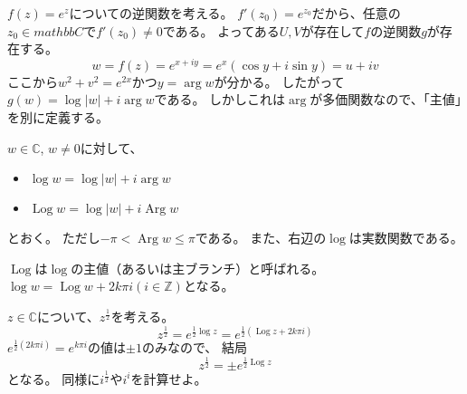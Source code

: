 \documentclass[a4paper]{jarticle}
\newcommand{\Log}{\operatorname{Log}}
\newcommand{\Arg}{\operatorname{Arg}}
\begin{document}
    $f(z)=e^{z}$についての逆関数を考える。
    $f'(z_0)=e^{z_0}$だから、任意の$z_0 \in mathbb{C}$で$f'(z_0) \neq 0$である。
    よってある$U, V$が存在して$f$の逆関数$g$が存在する。
    \[ w=f(z)=e^{x+iy}=e^x (\cos y+i\sin y)=u+iv \]
    ここから$w^2+v^2=e^{2x}$かつ$y=\arg w$が分かる。
    したがって$g(w)=\log |w| + i \arg w$である。
    しかしこれは$\arg$が多価関数なので、「主値」を別に定義する。

    \begin{Def}[対数関数]
        $w \in \mathbb{C}$, $w \neq 0$に対して、
        \begin{itemize}
            \item $\log w=\log |w|+i \arg w$
            \item $\Log w=\log |w|+i \Arg w$
        \end{itemize}
        とおく。
        ただし$-\pi < \Arg w \leq \pi$である。
        また、右辺の$\log$は実数関数である。
    \end{Def}
    $\Log$は$\log$の主値（あるいは主ブランチ）と呼ばれる。
    $\log w=\Log w + 2 k \pi i (i \in \mathbb{Z})$となる。

    $z \in \mathbb{C}$について、$z^{\frac{1}{2}}$を考える。
    \[ z^{\frac{1}{2}}=e^{\frac{1}{2} \log z}=e^{\frac{1}{2} (\Log z+2k \pi i)} \]
    $e^{\frac{1}{2} (2k \pi i)}=e^{k \pi i}$の値は$\pm 1$のみなので、
    結局\[ z^{\frac{1}{2}}=\pm e^{\frac{1}{2} \Log z}\]となる。
    同様に$i^{\frac{1}{2}}$や$i^i$を計算せよ。
\end{document}
